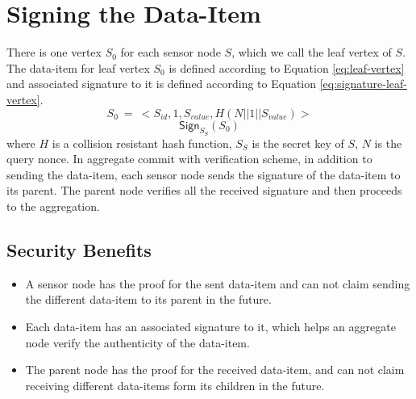 \section{Signing the Data-Item}
	There is one vertex $S_{0}$ for each sensor node $S$, which we call the leaf vertex of $S$.
	The data-item for leaf vertex $S_{0}$ is defined according to Equation \ref{eq:leaf-vertex} and associated signature to it is defined according to Equation \ref{eq:signature-leaf-vertex}.
	\begin{equation}
		\label{eq:leaf-vertex}
		S_{0}\ =\ <S_{id}, 1, S_{value}, H(N||1||S_{value})>
	\end{equation}
	\begin{equation}
		\label{eq:signature-leaf-vertex}
		\textsf{Sign}_{S_{S}}(S_{0})
	\end{equation}
	where $H$ is a collision resistant hash function, $S_{S}$ is the secret key of $S$, $N$ is the query nonce.
	In aggregate commit with verification scheme, in addition to sending the data-item, each sensor node sends the signature of the data-item to its parent.
	The parent node verifies all the received signature and then proceeds to the aggregation.
	
	\subsection{Security Benefits}
		\begin{itemize}
			\item A sensor node has the proof for the sent data-item and can not claim sending the different data-item to its parent in the future.
			\item Each data-item has an associated signature to it, which helps an aggregate node verify the authenticity of the data-item.
			\item The parent node has the proof for the received data-item, and can not claim receiving different data-items form its children in the future.
		\end{itemize}

